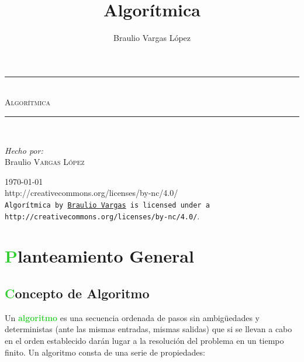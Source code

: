 \documentclass[10pt,a4paper,spanish]{report}
\title{Algorítmica}
\author{Braulio Vargas López}
\theoremstyle{definition}
\theoremstyle{remark}
\newcommand{\HRule}{\rule{\linewidth}{0.5mm}} %
\begin{document}
      \begin{titlepage}
            \begin{center}
                  \HRule \\[0.4cm]
                  \textsc{\Huge \textcolor[rgb]{0.2,0.8,0.}Algorítmica}\\[1.5cm]
                  \HRule \\[1cm]
                  \begin{flushleft}
                        \emph{Hecho por:}\\
                        Braulio \textsc{Vargas López}
                  \end{flushleft}
                  \vspace{10cm}
                  {\Large \today}
                  \vspace{5mm}
                  \\
            {http://creativecommons.org/licenses/by-nc/4.0/}\\
            \texttt{Algorítmica by
            \href{mailto:blackbrawl@gmail.com}{Braulio Vargas}
            is licensed under a 
            {http://creativecommons.org/licenses/by-nc/4.0/}}.
            \end{center}
      \end{titlepage}


      \tableofcontents

\chapter{\textcolor{LimeGreen}Planteamiento General}
    \section{\textcolor{LimeGreen}Concepto de Algoritmo}

    
    Un \textbf{\textcolor{LimeGreen}{algoritmo}} es una secuencia ordenada de pasos sin ambigüedades y deterministas (ante las mismas entradas, mismas salidas) que si se llevan a cabo en el orden establecido darán lugar a la resolución del problema en un tiempo finito. Un algoritmo consta de una serie de propiedades:
\end{document}

